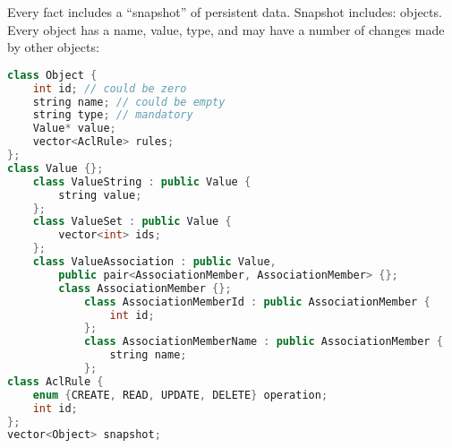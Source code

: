 \documentclass{article}
\begin{document}
    
    Every fact includes a ``snapshot'' of persistent data. Snapshot includes:
    objects. Every object
    has a name, value, type, 
    and may have a number of changes made by other objects:
    
    \begin{lstlisting}[language=C++]
class Object {
    int id; // could be zero
    string name; // could be empty
    string type; // mandatory
    Value* value; 
    vector<AclRule> rules;
};
class Value {};
    class ValueString : public Value {
        string value;
    };
    class ValueSet : public Value {
        vector<int> ids;
    };
    class ValueAssociation : public Value, 
        public pair<AssociationMember, AssociationMember> {};
        class AssociationMember {};
            class AssociationMemberId : public AssociationMember {
                int id;
            };
            class AssociationMemberName : public AssociationMember {
                string name;
            };
class AclRule {
    enum {CREATE, READ, UPDATE, DELETE} operation;
    int id;
};
vector<Object> snapshot;
\end{lstlisting}
\end{document}
